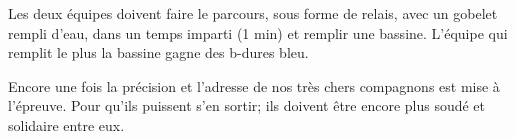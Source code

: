 \documentclass{grand-jeu}
\begin{document}
\begin{liste-materiel}
\end{liste-materiel}

\begin{regles}
Les deux équipes doivent faire le parcours, sous forme de relais, avec un gobelet rempli d’eau, dans un temps imparti (1 min) et remplir une bassine. L’équipe qui remplit le plus la bassine gagne des b-dures bleu. 

\end{regles}

\begin{imaginaire}

Encore une fois la précision et l'adresse de nos très chers compagnons est mise à l'épreuve.
Pour qu'ils puissent s'en sortir; ils doivent être encore plus soudé et solidaire entre eux.

\end{imaginaire}

\begin{moments-stop}
\end{moments-stop}
\end{document}
